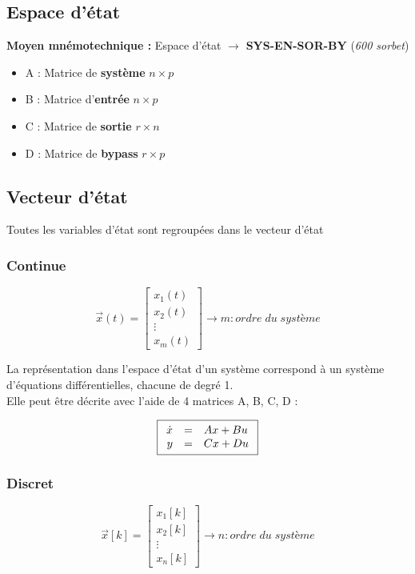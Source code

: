 \documentclass[document.tex]{subfiles}
\begin{document}
\subsection{Espace d'état}

\textbf{Moyen mnémotechnique : } Espace d'état $\rightarrow$ \textbf{SYS-EN-SOR-BY} (\textit{600 sorbet})\\[6pt]

\begin{itemize}
	\item A : Matrice de \textbf{système} $n\times p$
	\item B : Matrice d'\textbf{entrée} $n\times p$
	\item C : Matrice de \textbf{sortie} $r\times n$
	\item D : Matrice de \textbf{bypass} $r\times p$
\end{itemize}


\subsection{Vecteur d'état}
Toutes les variables d'état sont regroupées dans le vecteur d'état

\subsubsection{Continue}
\begin{equation}
	\vec{x}(t) = \begin{bmatrix}
		x_1(t) \\ x_2(t) \\ \vdots \\ x_m(t)
	\end{bmatrix} \rightarrow m : ordre \; du \; système
\end{equation}

La représentation dans l'espace d'état d'un système correspond à un système d'équations différentielles, chacune de degré 1.\\

Elle peut être décrite avec l'aide de 4 matrices A, B, C, D :

\begin{equation}
\boxed{
\begin{array}{r c l}
		\dot{x} & = & Ax + Bu \\
		y       & = & Cx + Du
\end{array}
}
\end{equation}

\subsubsection{Discret}
\begin{equation}
	\vec{x}[k] = \begin{bmatrix}
		x_1[k] \\ x_2[k] \\ \vdots \\ x_n[k]
	\end{bmatrix} \rightarrow n : ordre \; du \; système
\end{equation}
\end{document}
